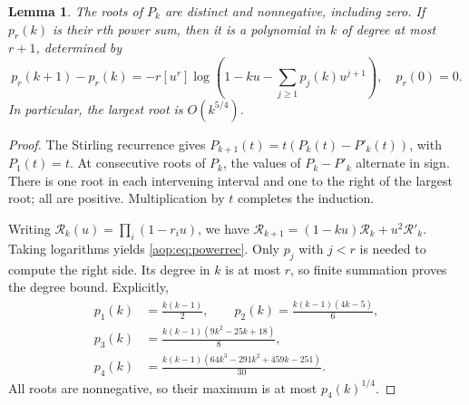 \documentclass[11pt]{article}
\newtheorem{lemma}[theorem]{Lemma}
\theoremstyle{remark}\newtheorem{remark}[theorem]{Remark}
\newcommand{\coeff}[2]{[#1^{#2}]}
\begin{document}
\begin{lemma}\label{aop:lem:roots}
The roots of $P_k$ are distinct and nonnegative, including zero. If
$p_r(k)$ is their $r$th power sum, then it is a polynomial in $k$ of
degree at most $r+1$, determined by
\begin{equation}\label{aop:eq:powerrec}
 p_r(k+1)-p_r(k)=-r\coeff ur
 \log\left(1-ku-\sum_{j\ge1}p_j(k)u^{j+1}\right),\quad p_r(0)=0.
\end{equation}
In particular, the largest root is $O(k^{5/4})$.
\end{lemma}
\begin{proof}
The Stirling recurrence gives
$P_{k+1}(t)=t(P_k(t)-P'_k(t))$, with $P_1(t)=t$.
At consecutive roots of $P_k$, the values of $P_k-P'_k$ alternate in
sign. There is one root in each intervening interval and one to the
right of the largest root; all are positive. Multiplication by $t$
completes the induction.

Writing $\mathcal R_k(u)=\prod_i(1-r_i u)$, we have
$\mathcal R_{k+1}=(1-ku)\mathcal R_k+u^2\mathcal R'_k$.
Taking logarithms yields \eqref{aop:eq:powerrec}. Only $p_j$ with $j<r$
is needed to compute the right side. Its degree in $k$ is at most $r$,
so finite summation proves the degree bound. Explicitly,
\begin{align}
 p_1(k)&=\frac{k(k-1)}2,\qquad
 p_2(k)=\frac{k(k-1)(4k-5)}6,\\
 p_3(k)&=\frac{k(k-1)(9k^2-25k+18)}8,\\
 p_4(k)&=\frac{k(k-1)(64k^3-291k^2+459k-251)}{30}.
 \label{aop:eq:p4}
\end{align}
All roots are nonnegative, so their maximum is at most $p_4(k)^{1/4}$.
\end{proof}
\end{document}
